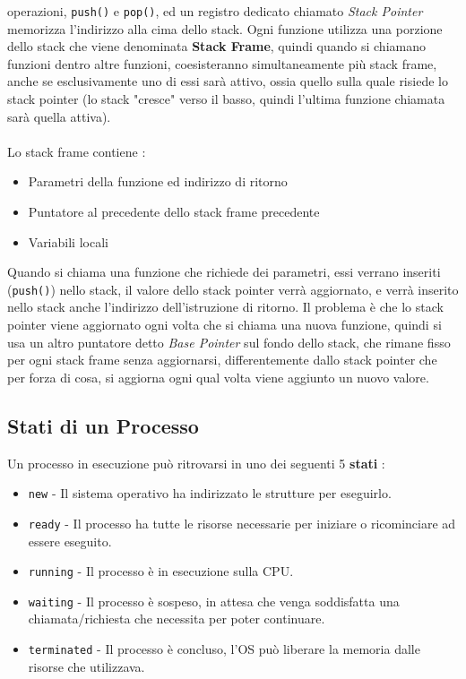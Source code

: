 \documentclass[12pt, letterpaper]{article}
\newcommand{\code}[1]{\colorbox{light-gray}{\texttt{#1}}}
\begin{document}
operazioni, \code{push()} e \code{pop()}, ed un registro dedicato chiamato \textit{Stack Pointer} memorizza 
l'indirizzo alla cima dello stack. Ogni funzione utilizza una porzione dello stack che viene denominata 
\textbf{Stack Frame}, quindi quando si chiamano funzioni dentro altre funzioni, coesisteranno simultaneamente 
più stack frame, anche se esclusivamente uno di essi sarà attivo, ossia quello sulla quale risiede lo 
stack pointer (lo stack "cresce" verso il basso, quindi l'ultima funzione chiamata sarà quella attiva). 
\\\hphantom{.}\\ Lo stack frame contiene :\begin{itemize}
    \item Parametri della funzione ed indirizzo di ritorno
    \item Puntatore al precedente dello stack frame precedente
    \item Variabili locali
\end{itemize}
Quando si chiama una funzione che richiede dei parametri,
essi verrano inseriti (\code{push()}) nello stack, il valore dello stack pointer verrà aggiornato, e verrà inserito nello 
stack anche l'indirizzo dell'istruzione di ritorno. Il problema è che lo stack pointer viene aggiornato ogni 
volta che si chiama una nuova funzione, quindi si usa un altro puntatore detto \textit{Base Pointer} sul fondo 
dello stack, che rimane fisso per ogni stack frame senza aggiornarsi, differentemente dallo stack pointer che per 
forza di cosa, si aggiorna ogni qual volta viene aggiunto un nuovo valore.\newpage \subsection{Stati di un Processo}
Un processo in esecuzione può ritrovarsi in uno dei seguenti 5 \textbf{stati} : \begin{itemize}
    \item \code{new} - Il sistema operativo ha indirizzato le strutture per eseguirlo.
    \item \code{ready} - Il processo ha tutte le risorse necessarie per iniziare o ricominciare ad essere eseguito.
    \item \code{running} - Il processo è in esecuzione sulla CPU.
    \item \code{waiting} - Il processo è sospeso, in attesa che venga soddisfatta una chiamata/richiesta che necessita per poter continuare.
    \item \code{terminated} - Il processo è concluso, l'OS può liberare la memoria dalle risorse che utilizzava.
\end{itemize}
\begin{figure}[h]
\end{figure}
\end{document}
